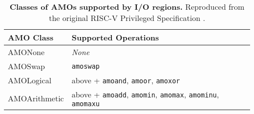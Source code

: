 \begin{table*}[htp]
\begin{center}
\begin{tabular}{|l|l|}
  \hline
  AMO Class & Supported Operations \\
  \hline
  AMONone       & {\em None} \\
  AMOSwap       & {\tt amoswap} \\
  AMOLogical    & above + {\tt amoand}, {\tt amoor}, {\tt amoxor} \\
  AMOArithmetic & above + {\tt amoadd}, {\tt amomin}, {\tt amomax}, {\tt amominu}, {\tt amomaxu} \\
  \hline
\end{tabular}
\end{center}
\caption[RISC-V Atomic Instructions for I/O]{\textbf{Classes of AMOs supported by I/O regions.} Reproduced from the original RISC-V Privileged Specification \cite{PrivIsa2019}.}
\label{table:riscv-pma-amo}
\end{table*}